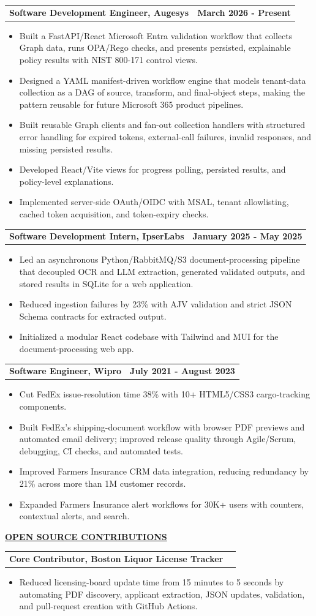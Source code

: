 \documentclass[letterpaper,10pt]{article}
\makeatletter
\newcommand{\resumeSection}[1]{%
  \vspace{12.2bp}
  {\bfseries\underline{#1}}\par
}
\newcommand{\resumeSubheading}[2]{%
  \begin{tabular*}{\textwidth}{@{}l@{\extracolsep{\fill}}r@{}}
    \bfseries #1 & \bfseries #2
  \end{tabular*}\par
}
\newcommand{\resumeSubHeadingListEnd}{\endgroup}
\newcommand{\resumeItemListStart}{%
  \begin{itemize}[
    leftmargin=36bp,
    labelindent=18.8bp,
    labelwidth=4.2bp,
    labelsep=13bp,
    topsep=0pt,
    partopsep=0pt,
    parsep=0pt,
    itemsep=0pt
  ]
}
\newcommand{\resumeItemListEnd}{\end{itemize}}
\newcommand{\resumeItem}[1]{\item #1}
\makeatother
\begin{document}
\resumeSubheading{Software Development Engineer, Augesys}{March 2026 - Present}
\resumeItemListStart
  \resumeItem{Built a FastAPI/React Microsoft Entra validation workflow that collects Graph data, runs OPA/Rego checks, and presents persisted, explainable policy results with NIST 800-171 control views.}
  \resumeItem{Designed a YAML manifest-driven workflow engine that models tenant-data collection as a DAG of source, transform, and final-object steps, making the pattern reusable for future Microsoft 365 product pipelines.}
  \resumeItem{Built reusable Graph clients and fan-out collection handlers with structured error handling for expired tokens, external-call failures, invalid responses, and missing persisted results.}
  \resumeItem{Developed React/Vite views for progress polling, persisted results, and policy-level explanations.}
  \resumeItem{Implemented server-side OAuth/OIDC with MSAL, tenant allowlisting, cached token acquisition, and token-expiry checks.}
\resumeItemListEnd

\resumeSubheading{Software Development Intern, IpserLabs}{January 2025 - May 2025}
\resumeItemListStart
  \resumeItem{Led an asynchronous Python/RabbitMQ/S3 document-processing pipeline that decoupled OCR and LLM extraction, generated validated outputs, and stored results in SQLite for a web application.}
  \resumeItem{Reduced ingestion failures by 23\% with AJV validation and strict JSON Schema contracts for extracted output.}
  \resumeItem{Initialized a modular React codebase with Tailwind and MUI for the document-processing web app.}
\resumeItemListEnd

\resumeSubheading{Software Engineer, Wipro}{July 2021 - August 2023}
\resumeItemListStart
  \resumeItem{Cut FedEx issue-resolution time 38\% with 10+ HTML5/CSS3 cargo-tracking components.}
  \resumeItem{Built FedEx's shipping-document workflow with browser PDF previews and automated email delivery; improved release quality through Agile/Scrum, debugging, CI checks, and automated tests.}
  \resumeItem{Improved Farmers Insurance CRM data integration, reducing redundancy by 21\% across more than 1M customer records.}
  \resumeItem{Expanded Farmers Insurance alert workflows for 30K+ users with counters, contextual alerts, and search.}
\resumeItemListEnd
\resumeSubHeadingListEnd

\resumeSection{OPEN SOURCE CONTRIBUTIONS}
\resumeSubheading{Core Contributor, Boston Liquor License Tracker}{}
\resumeItemListStart
  \resumeItem{Reduced licensing-board update time from 15 minutes to 5 seconds by automating PDF discovery, applicant extraction, JSON updates, validation, and pull-request creation with GitHub Actions.}
\resumeItemListEnd
\end{document}
